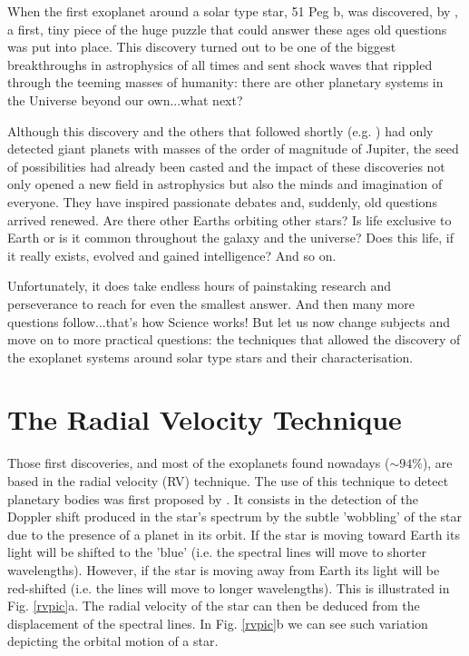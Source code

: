 \documentclass[dvips,12pt,a4paper]{report}
\begin{document}
When the first exoplanet around a solar type star, 51 Peg b, was discovered, by \citet{Mayor-1995}, %
a first, tiny piece of the huge puzzle that could answer these ages old questions was put into place. This discovery turned out to be one of the biggest breakthroughs in astrophysics of all times and sent shock waves that rippled through the teeming masses of humanity: there are other planetary systems in the Universe beyond our own...what next?

\indent Although this discovery and the others that followed shortly (e.g. \citeauthor{Marcy-1996} \citeyear{Marcy-1996}) had only detected giant planets with masses of the order of magnitude of Jupiter, the seed of possibilities had already been casted and the impact of these discoveries not only  opened a new field in astrophysics but also the minds and imagination of everyone. They have inspired passionate debates and, suddenly, old questions arrived renewed. Are there other Earths orbiting other stars? Is life exclusive to Earth or is it common throughout the galaxy and the universe? Does this life, if it really exists, evolved and gained intelligence? And so on.

Unfortunately, it does take endless hours of painstaking research and perseverance to reach for even the smallest answer. And then many more questions follow...that's how Science works! But let us now change subjects and move on to more practical questions: the techniques that allowed the discovery of the exoplanet systems around solar type stars and their characterisation.


\section{The Radial Velocity Technique}

Those first discoveries, and most of the exoplanets found nowadays ($\sim 94\%$), are based in the radial velocity (RV) technique. The use of this technique to detect planetary bodies was first proposed by \citet{Struve-1952}. It consists in the detection of the Doppler shift produced in the star's spectrum  by the subtle 'wobbling' of the star due to the presence of a planet in its orbit. If the star is moving toward Earth its light will be shifted to the 'blue' (i.e. the spectral lines will move to shorter wavelengths). However, if the star is moving away from Earth its light will be red-shifted (i.e. the lines will move to longer wavelengths). This is illustrated in Fig. \ref{rvpic}a. The radial velocity of the star can then be deduced from the displacement of the spectral lines. In Fig. \ref{rvpic}b we can see such variation depicting the orbital motion of a star.
\end{document}
